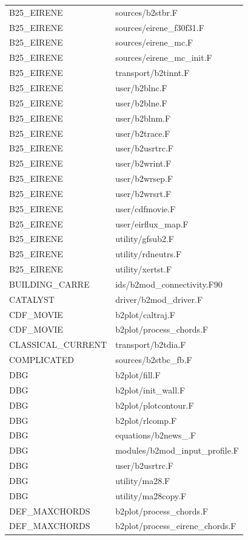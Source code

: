 \documentclass[a4paper,10pt]{report}
\begin{document}
\begin{center}
\begin{longtable}{|l|l|}
B25\_EIRENE & sources/b2stbr.F \\
B25\_EIRENE & sources/eirene\_f30f31.F \\
B25\_EIRENE & sources/eirene\_mc.F \\
B25\_EIRENE & sources/eirene\_mc\_init.F \\
B25\_EIRENE & transport/b2tinnt.F \\
B25\_EIRENE & user/b2blnc.F \\
B25\_EIRENE & user/b2blne.F \\
B25\_EIRENE & user/b2blnm.F \\
B25\_EIRENE & user/b2trace.F \\
B25\_EIRENE & user/b2usrtrc.F \\
B25\_EIRENE & user/b2wrint.F \\
B25\_EIRENE & user/b2wrsep.F \\
B25\_EIRENE & user/b2wrsrt.F \\
B25\_EIRENE & user/cdfmovie.F \\
B25\_EIRENE & user/eirflux\_map.F \\
B25\_EIRENE & utility/gfsub2.F \\
B25\_EIRENE & utility/rdneutrs.F \\
B25\_EIRENE & utility/xertst.F \\
BUILDING\_CARRE & ids/b2mod\_connectivity.F90 \\
CATALYST & driver/b2mod\_driver.F \\
CDF\_MOVIE & b2plot/caltraj.F \\
CDF\_MOVIE & b2plot/process\_chords.F \\
CLASSICAL\_CURRENT & transport/b2tdia.F \\
COMPLICATED & sources/b2stbc\_fb.F \\
DBG & b2plot/fill.F \\
DBG & b2plot/init\_wall.F \\
DBG & b2plot/plotcontour.F \\
DBG & b2plot/rlcomp.F \\
DBG & equations/b2news\_.F \\
DBG & modules/b2mod\_input\_profile.F \\
DBG & user/b2usrtrc.F \\
DBG & utility/ma28.F \\
DBG & utility/ma28copy.F \\
DEF\_MAXCHORDS & b2plot/process\_chords.F \\
DEF\_MAXCHORDS & b2plot/process\_eirene\_chords.F \\

\end{longtable}
\end{center}
\end{document}
